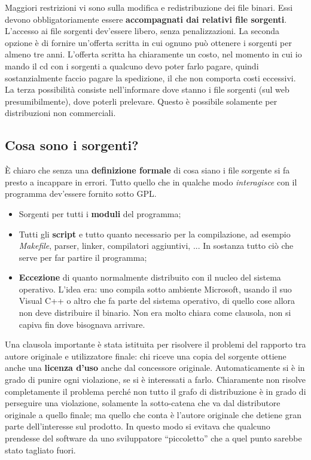 Maggiori restrizioni vi sono sulla modifica e redistribuzione dei file binari. Essi devono obbligatoriamente essere \textbf{accompagnati dai relativi file sorgenti}. L'accesso ai file sorgenti dev'essere libero, senza penalizzazioni. La seconda opzione è di fornire un'offerta scritta in cui ognuno può ottenere i sorgenti per almeno tre anni. L'offerta scritta ha chiaramente un costo, nel momento in cui io mando il cd con i sorgenti a qualcuno devo poter farlo pagare, quindi sostanzialmente faccio pagare la spedizione, il che non comporta costi eccessivi. La terza possibilità consiste nell'informare dove stanno i file sorgenti (sul web presumibilmente), dove poterli prelevare. Questo è possibile solamente per distribuzioni non commerciali.  

\subsection{Cosa sono i sorgenti?}

È chiaro che senza una \textbf{definizione formale} di cosa siano i file sorgente si fa presto a incappare in errori. Tutto quello che in qualche modo \textit{interagisce} con il programma dev'essere fornito sotto GPL. 

\begin{itemize}

\item Sorgenti per tutti i \textbf{moduli} del programma;

\item Tutti gli \textbf{script} e tutto quanto necessario per la compilazione, ad esempio \textit{Makefile}, parser, linker, compilatori aggiuntivi, ... In sostanza tutto ciò che serve per far partire il programma;

\item \textbf{Eccezione} di quanto normalmente distribuito con il nucleo del sistema operativo. L'idea era: uno compila sotto ambiente Microsoft, usando il suo Visual C++ o altro che fa parte del sistema operativo, di quello cose allora non deve distribuire il binario. Non era molto chiara come clausola, non si capiva fin dove bisognava arrivare.
 
\end{itemize}

Una clausola importante è stata istituita per risolvere il problemi del rapporto tra autore originale e utilizzatore finale: chi riceve una copia del sorgente ottiene anche una \textbf{licenza d'uso} anche dal concessore originale. Automaticamente si è in grado di punire ogni violazione, se si è interessati a farlo. Chiaramente non risolve completamente il problema perché non tutto il grafo di distribuzione è in grado di perseguire una violazione, solamente la sotto-catena che va dal distributore originale a quello finale; ma quello che conta è l'autore originale che detiene gran parte dell'interesse sul prodotto. In questo modo si evitava che qualcuno prendesse del software da uno sviluppatore ``piccoletto'' che a quel punto sarebbe stato tagliato fuori. 


